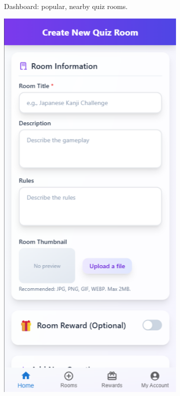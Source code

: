 \begin{figure}[h!]
\begin{subfigure}[b]{0.3\textwidth}
        \caption{Dashboard: popular, nearby quiz rooms.}
        \label{fig:first_image}
    \end{subfigure}
    \hfill
    \begin{subfigure}[b]{0.3\textwidth}
        \centering
        \includegraphics[width=\textwidth]{figures/ui-room-generator.png}

\end{subfigure}
\end{figure}
